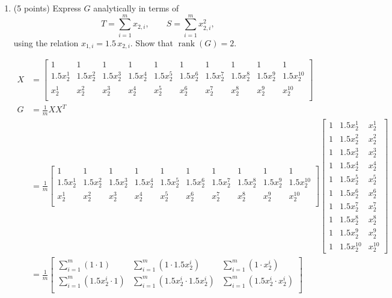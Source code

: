 \documentclass[twoside,12pt]{article}
\begin{document}
\begin{enumerate}
    \item (5 points) Express $G$ analytically in terms of
    \[
    T=\sum_{i=1}^m x_{2,i},\qquad S=\sum_{i=1}^m x_{2,i}^2,
    \]
    using the relation $x_{1,i}=1.5\,x_{2,i}$. Show that $\operatorname{rank}(G)=2$. 

    \begin{align}
    X &= \begin{bmatrix}1 & 1 & 1 & 1 & 1 & 1 & 1 & 1 & 1 & 1\\ 
        1.5x_2^1 & 1.5x_2^2 &1.5x_2^3 &1.5x_2^4 &1.5x_2^5 &1.5x_2^6 &1.5x_2^7&1.5x_2^8&1.5x_2^9&1.5x_2^{10} \\
        x_2^1 & x_2^2 &x_2^3 &x_2^4 &x_2^5 &x_2^6 &x_2^7&x_2^8&x_2^9&x_2^{10} \\
    \end{bmatrix} \\
     G &= \frac{1}{m} X X^T \\
     &= \frac{1}{m}
     \begin{bmatrix}1 & 1 & 1 & 1 & 1 & 1 & 1 & 1 & 1 & 1\\ 
        1.5x_2^1 & 1.5x_2^2 &1.5x_2^3 &1.5x_2^4 &1.5x_2^5 &1.5x_2^6 &1.5x_2^7&1.5x_2^8&1.5x_2^9&1.5x_2^{10} \\
        x_2^1 & x_2^2 &x_2^3 &x_2^4 &x_2^5 &x_2^6 &x_2^7&x_2^8&x_2^9&x_2^{10} \\
    \end{bmatrix} 
     \begin{bmatrix}
        1 & 1.5 x_2^1 & x_2^1 \\
        1 & 1.5 x_2^2 & x_2^2 \\
        1 & 1.5 x_2^3 & x_2^3 \\
        1 & 1.5 x_2^4 & x_2^4 \\
        1 & 1.5 x_2^5 & x_2^5 \\
        1 & 1.5 x_2^6 & x_2^6 \\
        1 & 1.5 x_2^7 & x_2^7 \\
        1 & 1.5 x_2^8 & x_2^8 \\
        1 & 1.5 x_2^9 & x_2^9 \\
        1 & 1.5 x_2^{10} & x_2^{10}
    \end{bmatrix}\\
     &=\frac{1}{m} 
     \begin{bmatrix}
        \sum_{i=1}^m (1\cdot 1) & \sum_{i=1}^m (1\cdot 1.5 x_2^i) & \sum_{i=1}^m (1\cdot x_2^i)\\
        \sum_{i=1}^m (1.5x_2^i \cdot 1) & \sum_{i=1}^m (1.5x_2^i \cdot  1.5x_2^i)& \sum_{i=1}^m (1.5x_2^i \cdot  x_2^i)\\

\end{bmatrix}
\end{align}
\end{enumerate}
\end{document}
